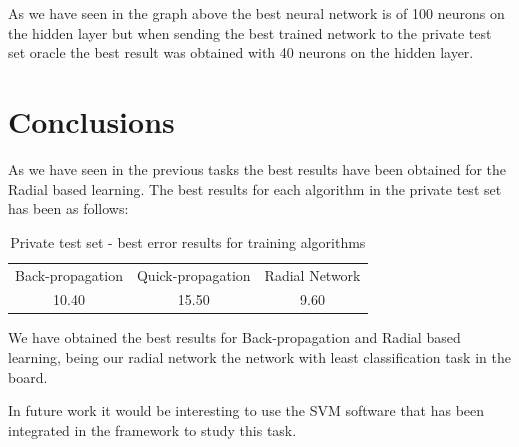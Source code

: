 \documentclass[a4paper,10pt,titlepage]{article}
\begin{document}
\par As we have seen in the graph above the best neural network is of 100 neurons on the hidden layer but when sending the best trained network to the private test set oracle the best result was obtained with 40 neurons on the hidden layer. 

\section{Conclusions}

\par As we have seen in the previous tasks the best results have been obtained for the Radial based learning. The best results for each algorithm in the private test set has been as follows: 

\begin{table}[H] 
\caption{Private test set - best error results for training algorithms} %
\centering 
\begin{tabular}{c c c} 
\hline\hline 
Back-propagation & Quick-propagation & Radial Network \\
10.40 & 15.50 &  9.60 \\

\hline 
\end{tabular} 
\label{tab:dist_result} 
\end{table}

\par We have obtained the best results for Back-propagation and Radial based learning, being our radial network the network with least classification task in the board.

\par In future work it would be interesting to use the SVM software that has been integrated in the framework to study this task.  
\end{document}
